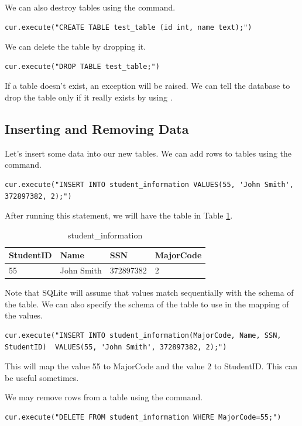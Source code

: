 We can also destroy tables using the  command.
\begin{lstlisting}
cur.execute("CREATE TABLE test_table (id int, name text);")
\end{lstlisting}
We can delete the table by dropping it.
\begin{lstlisting}
cur.execute("DROP TABLE test_table;")
\end{lstlisting}
If a table doesn't exist, an exception will be raised.
We can tell the database to drop the table only if it really exists by using .

\subsection*{Inserting and Removing Data}
Let's insert some data into our new tables.
We can add rows to tables using the  command.
\begin{lstlisting}
cur.execute("INSERT INTO student_information VALUES(55, 'John Smith', 372897382, 2);")
\end{lstlisting}
After running this statement, we will have the table in Table \ref{table:student_information1}.
\begin{table}
\begin{tabular}{|l|l|l|l|}
\hline
StudentID & Name & SSN & MajorCode \\
\hline
55 & John Smith & 372897382 & 2 \\
\hline
\end{tabular}
\caption{student\_information}
\label{table:student_information1}
\end{table}

Note that SQLite will assume that values match sequentially with the schema of the table.
We can also specify the schema of the table to use in the mapping of the values.
\begin{lstlisting}
cur.execute("INSERT INTO student_information(MajorCode, Name, SSN, StudentID)  VALUES(55, 'John Smith', 372897382, 2);")
\end{lstlisting}
This will map the value 55 to MajorCode and the value 2 to StudentID.  This can be useful sometimes.

We may remove rows from a table using the  command.
\begin{lstlisting}
cur.execute("DELETE FROM student_information WHERE MajorCode=55;")
\end{lstlisting}

